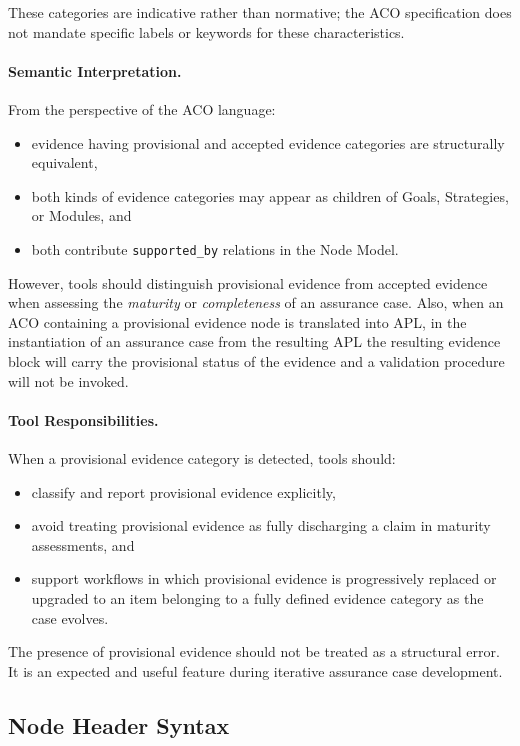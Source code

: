 \documentclass[11pt,twoside,a4paper]{article}
\begin{document}
These categories are indicative rather than normative; the ACO specification does
not mandate specific labels or keywords for these characteristics.

\paragraph{Semantic Interpretation.}
From the perspective of the ACO language:
\begin{itemize}[leftmargin=2em]
  \item evidence having provisional and accepted evidence categories are structurally equivalent,
  \item both kinds of evidence categories may appear as children of Goals, Strategies, or Modules, and
  \item both contribute \texttt{supported\_by} relations in the Node Model.
\end{itemize}

However, tools should distinguish provisional evidence from accepted evidence when
assessing the \emph{maturity} or \emph{completeness} of an assurance case.
Also, when an ACO containing a provisional evidence node is translated into APL, in the instantiation of an assurance case from the resulting APL the resulting evidence block will carry the provisional status of the evidence and a validation procedure will not be invoked.

\paragraph{Tool Responsibilities.}
When a provisional evidence category is detected, tools should:
\begin{itemize}[leftmargin=2em]
  \item classify and report provisional evidence explicitly,
  \item avoid treating provisional evidence as fully discharging a claim in
        maturity assessments, and
  \item support workflows in which provisional evidence is progressively replaced
        or upgraded to an item belonging to a fully defined evidence category as the case evolves.
\end{itemize}

The presence of provisional evidence should not be treated as a structural error.
It is an expected and useful feature during iterative assurance case development.

\subsection{Node Header Syntax}
\end{document}
